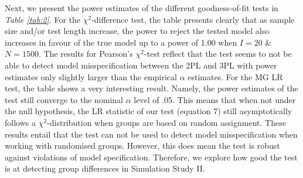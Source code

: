 \documentclass[Royal,sageapa,times,doublespace]{sagej}
\begin{document}
\indent Next, we present the power estimates of the different goodness-of-fit tests in \textit{Table \ref{tab:2}}. For the $\chi^2$-difference test, the table presents clearly that as sample size and/or test length increase, the power to reject the tested model also increases in favour of the true model up to a power of 1.00 when $I = 20$ \& $N = 1500$. The results for Pearson's $\chi^2$-test reflect that the test seems to not be able to detect model misspecification between the 2PL and 3PL with power estimates only slightly larger than the empirical $\alpha$ estimates. For the MG LR test, the table shows a very interesting result. Namely, the power estimates of the test still converge to the nominal $\alpha$ level of .05. This means that when not under the null hypothesis, the LR statistic of our test (equation 7) still asymptotically follows a $\chi^2$-distribution when groups are based on random assignment. These results entail that the test can not be used to detect model misspecification when working with randomised groups. However, this does mean the test is robust against violations of model specification. Therefore, we explore how good the test is at detecting group differences in Simulation Study II.
\end{document}
